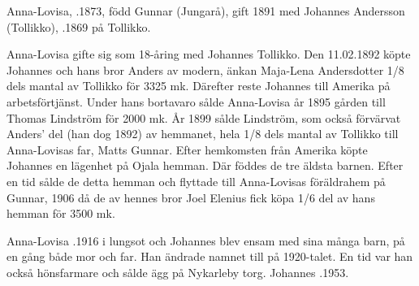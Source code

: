 


Anna-Lovisa, .1873, född Gunnar (Jungarå), gift 1891 med Johannes Andersson (Tollikko), .1869 på Tollikko.
\begin{jhchildren}
  \item {}
  \item {}
  \item {}
  \item {}
  \item {}
  \item {}
  \item {}
  \item {}
  \item {}
  \item {}
\end{jhchildren}
Anna-Lovisa gifte sig som 18-åring med Johannes Tollikko. Den 11.02.1892 köpte Johannes och hans bror Anders av modern, änkan Maja-Lena Andersdotter 1/8 dels mantal av Tollikko för 3325 mk. Därefter reste Johannes till Amerika på arbetsförtjänst. Under hans bortavaro sålde Anna-Lovisa år 1895 gården till Thomas Lindström för 2000 mk. År 1899 sålde Lindström, som också förvärvat Anders' del (han dog 1892) av hemmanet, hela 1/8 dels mantal av Tollikko till Anna-Lovisas far, Matts Gunnar.
Efter hemkomsten från Amerika köpte Johannes en lägenhet på Ojala hemman. Där föddes de tre äldsta barnen. Efter en tid sålde de detta hemman och flyttade till Anna-Lovisas föräldrahem på Gunnar, 1906 då de av hennes bror Joel Elenius fick köpa 1/6 del av hans hemman för 3500 mk.

Anna-Lovisa .1916 i lungsot och Johannes blev ensam med sina många barn, på en gång både mor och far. Han ändrade namnet till  på 1920-talet. En tid var han också hönsfarmare och sålde ägg på Nykarleby torg. Johannes .1953.



